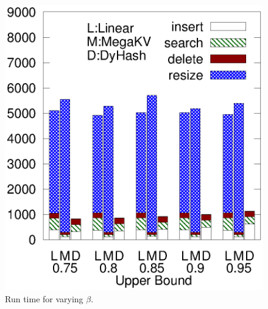 \begin{figure}[h]
\begin{minipage}{0.18\linewidth}
		\centerline{\dsali}
	\end{minipage}
	\hfill
	\begin{minipage}{0.18\linewidth}\centering
		\includegraphics[width=\linewidth]{pic/dynamic/random/diff_upper.eps}
		\centerline{\dsrandom}
	\end{minipage}
	\caption{Run time for varying $\beta$.}
	\label{fig:vary-alpha-time}
\end{figure}


